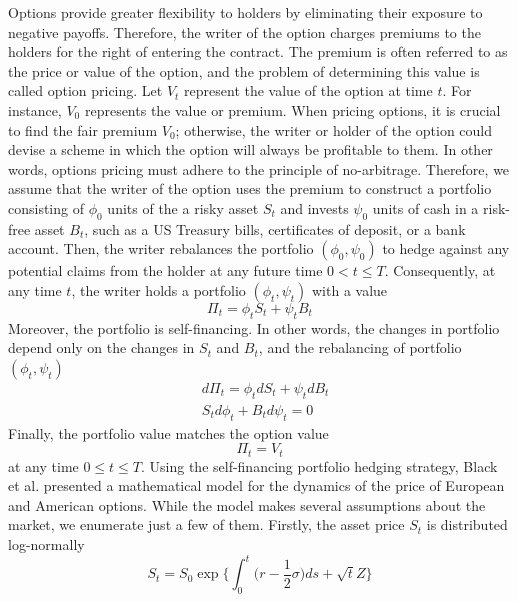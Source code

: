 Options provide greater flexibility to holders by eliminating their exposure to negative payoffs. Therefore, the writer of the option charges premiums to the holders for the right of entering the contract. The premium is often referred to as the price or value of the option, and the problem of determining this value is called option pricing. Let $V_t$ represent the value of the option at time $t$. For instance, $V_0$ represents the value or premium. When pricing options, it is crucial to find the fair premium $V_0$; otherwise, the writer or holder of the option could devise a scheme in which the option will always be profitable to them. In other words, options pricing must adhere to the principle of no-arbitrage. Therefore, we assume that the writer of the option uses the premium to construct a portfolio consisting of $\phi_0$ units of the a risky asset $S_t$ and invests $\psi_0$ units of cash in a risk-free asset $B_t$, such as a US Treasury bills, certificates of deposit, or a bank account. Then, the writer rebalances the portfolio $(\phi_0, \psi_0)$ to hedge against any potential claims from the holder at any future time $0 < t \le T$. Consequently, at any time $t$, the writer holds a portfolio $(\phi_t, \psi_t)$ with a value
\begin{equation*}
  \Pi_t = \phi_t S_t + \psi_t B_t
\end{equation*}
Moreover, the portfolio is self-financing. In other words, the changes in
portfolio depend only on the changes in $S_t$ and $B_t$,
and the rebalancing of portfolio $(\phi_t, \psi_t)$
\begin{align*}
   & d\Pi_t = \phi_tdS_t + \psi_t dB_t \\
   & S_t d\phi_t + B_t d\psi_t = 0
\end{align*}
Finally, the portfolio value matches the option value
\begin{equation*}
  \Pi_t = V_t
\end{equation*}
at any time $0 \le t \le T$. Using the self-financing portfolio hedging strategy, Black et al.\cite{black_scholes_1973} presented a mathematical model for the dynamics of the price of European and American options. While the model makes several assumptions about the market\cite{merton_1973}, we enumerate just a few of them. Firstly, the asset price $S_t$ is distributed log-normally
\begin{equation}
  \label{eq:blackscholes:preliminaries:asset_price}
  S_t = S_0 \exp\bigg\{\int_{0}^{t} \big(r - \dfrac{1}{2}\sigma\big)ds + \sqrt{t}Z\bigg\}
\end{equation}
